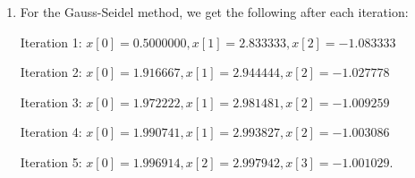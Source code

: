 \documentclass[12pt]{article}
\begin{document}
\begin{enumerate}[leftmargin=0em]
\begin{proof}
	Taking the maximum over all $\mathbf{x}$ with $\|\mathbf{x}\|_1 = 1$, we get:
	\[
		\|A\|_1 = \max_{\|\mathbf{x}\|_1=1} \|A\mathbf{x}\|_1 \leq \max_{1 \leq j \leq n} \sum_{i=1}^{n} |a_{ij}|.
	\]
	
	\textbf{Step 2.} $\|A\|_1 \geq \max\limits_{1 \leq j \leq n} \sum\limits_{i=1}^{n} |a_{ij}|.$
	
	There exists some $p$ such that:
	\[
		\sum\limits_{i=1}^{n} |a_{ip}| = \max\limits_{1 \leq j \leq n} \sum\limits_{i=1}^{n} |a_{ij}|.
	\]
	
	Define $\mathbf{x} = [x_j]$ as:
	\[
		x_j = \begin{cases} 1 & j = p, \\ 0 & \text{else}
		\end{cases}\]
		
		($\|\mathbf{x}\|_1 = 1.$ and $a_{ij} x_j = |a_{ip}|$.)
		
		\begin{align*}
			\|A\mathbf{x}\|_1 & = \sum\limits_{i=1}^{n} \left| \sum\limits_{j=1}^{n} a_{ij} x_j \right| \\
			                  & = \sum\limits_{i=1}^{n} |a_{ip}|                                        \\
			                  & = \max\limits_{1 \leq j \leq n} \sum\limits_{i=1}^{n} |a_{ij}|.         
		\end{align*}
		
		Thus,
		\[
			\|A\|_1 = \max_{\|\mathbf{x}\|_1=1} \|A\mathbf{x}\|_1 \geq \max_{1 \leq j \leq n} \sum_{i=1}^{n} |a_{ij}|.
		\]
		
		Since both inequalities hold, we conclude:
		\[
			\|A\|_1 = \max\limits_{1 \leq j \leq n} \sum\limits_{i=1}^{n} |a_{ij}|.
		\]
		    
	\end{proof}
 
    \item 
    For the Gauss-Seidel method, we get the following after each iteration:

    Iteration 1: $x[0] = 0.5000000, x[1] = 2.833333, x[2] = -1.083333$

    Iteration 2: $x[0] = 1.916667, x[1] = 2.944444, x[2] = -1.027778$

    Iteration 3: $x[0] = 1.972222, x[1] = 2.981481, x[2] = -1.009259$

    Iteration 4: $x[0] = 1.990741, x[1] = 2.993827, x[2] = -1.003086$

    Iteration 5: $x[0] = 1.996914, x[2] = 2.997942, x[3] = -1.001029$.


\end{enumerate}
\end{document}
